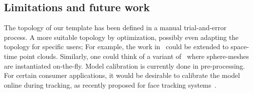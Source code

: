 \subsection*{Limitations and future work} 
The topology of our template has been defined in a manual trial-and-error process. A more suitable topology  by optimization, possibly even adapting the topology for specific users; For example, the work in~\cite{thiery2016spheremesh} could be extended to space-time point clouds. Similarly, one could think of a variant of~\cite{newcombe2015dynfusion} where sphere-meshes are instantiated on-the-fly.
% 
% 
Model calibration is currently done in pre-processing. For certain consumer applications, it would be desirable to calibrate the model online during tracking, as recently proposed for face tracking systems~\cite{bouaziz2013online}. 
% 
